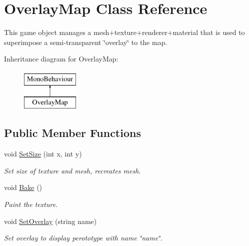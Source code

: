 \hypertarget{class_overlay_map}{}\section{Overlay\+Map Class Reference}
\label{class_overlay_map}


This game object manages a mesh+texture+renderer+material that is used to superimpose a semi-\/transparent \char`\"{}overlay\char`\"{} to the map.  


Inheritance diagram for Overlay\+Map\+:\begin{figure}[H]
\begin{center}
\leavevmode
\includegraphics[height=2.000000cm]{class_overlay_map}
\end{center}
\end{figure}
\subsection*{Public Member Functions}
\begin{DoxyCompactItemize}
\item 
void \hyperlink{class_overlay_map_a8745d98cd606fcf5f702a3d2d162f6a5}{Set\+Size} (int x, int y)
\begin{DoxyCompactList}\small\item\em Set size of texture and mesh, recreates mesh. \end{DoxyCompactList}\item 
void \hyperlink{class_overlay_map_ad9a3b08f69584626858cd7c26f7bff56}{Bake} ()
\begin{DoxyCompactList}\small\item\em Paint the texture. \end{DoxyCompactList}\item 
void \hyperlink{class_overlay_map_a60fd79e27c5b7f9c18d2bddf88f182b5}{Set\+Overlay} (string name)
\begin{DoxyCompactList}\small\item\em Set overlay to display perototype with name \char`\"{}name\char`\"{}. \end{DoxyCompactList}\end{DoxyCompactItemize}
